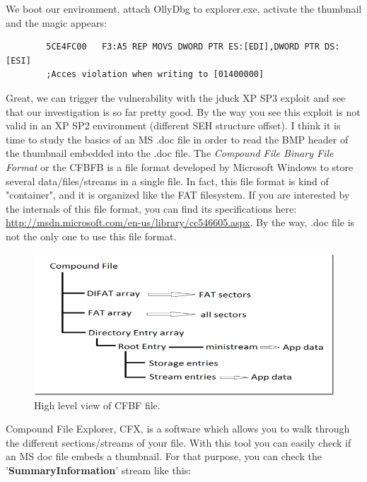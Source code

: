 \documentclass[12pt, titlepage]{article}
\begin{document}
We boot our environment, attach OllyDbg to explorer.exe, activate the thumbnail and the magic appears:

    \begin{lstlisting}
        5CE4FC00   F3:A5 REP MOVS DWORD PTR ES:[EDI],DWORD PTR DS:[ESI]
        ;Acces violation when writing to [01400000]
    \end{lstlisting}

Great, we can trigger the vulnerability with the jduck XP SP3 exploit and see that our investigation is so far pretty good. By the way you see this exploit is not valid in an XP SP2 environment (different SEH structure offset). I think it is time to study the basics of an MS .doc file in order to read the BMP header of the thumbnail embedded into the .doc file. The \emph{Compound File Binary File Format} or the CFBFB is a file format developed by Microsoft Windows to store several data/files/streams in a single file. In fact, this file format is kind of "container", and it is organized like the FAT filesystem. If you are interested by the internals of this file format, you can find its specifications here: \href{http://msdn.microsoft.com/en-us/library/cc546605.aspx}{http://msdn.microsoft.com/en-us/library/cc546605.aspx}. By the way, .doc file is not the only one to use this file format.

\begin{figure}[h]
    \includegraphics{pics/cfbf.png}
    \caption{High level view of CFBF file.}
    \label{High level view of CFBF file.}
\end{figure}

Compound File Explorer, CFX, is a software which allows you to walk through the different sections/streams of your file. With this tool you can easily check if an MS doc file embeds a thumbnail. For that purpose, you can check the '\textbf{SummaryInformation}' stream like this:
\end{document}

